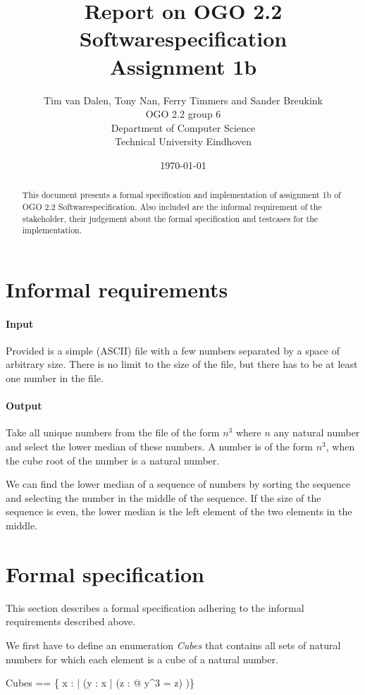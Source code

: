 \documentclass[12pt]{article}
\title{Report on OGO 2.2 Softwarespecification\\ Assignment 1b}
\author{
        Tim van Dalen, Tony Nan, Ferry Timmers and Sander Breukink\\ OGO 2.2 group 6 \\
                Department of Computer Science\\
        Technical University Eindhoven\\
}
\date{\today}
\begin{document}
\maketitle

\begin{abstract}
This document presents a formal specification and implementation of assignment 1b of OGO 2.2 Softwarespecification. Also included are the informal requirement of the stakeholder, their judgement about the formal specification and testcases for the implementation.
\end{abstract}

\section{Informal requirements}
\paragraph{Input} Provided is a simple (ASCII) file with a few numbers separated by a space of arbitrary size. There is no limit to the size of the file, but there has to be at least one number in the file.

\paragraph{Output} Take all unique numbers from the file of the form $n^3$ where $n$ any natural number and select the lower median of these numbers. A number is of the form $n^3$, when the cube root of the number is a natural number.

We can find the lower median of a sequence of numbers by sorting the sequence and selecting the number in the middle of the sequence. If the size of the sequence is even, the lower median is the left element of the two elements in the middle.

\section{Formal specification}

This section describes a formal specification adhering to the informal requirements described above.

We first have to define an enumeration \textit{Cubes} that contains all sets of natural numbers for which each element is a cube of a natural number.
\begin{axdef}
Cubes == \{ x : \power \nat | (\forall y : x | (\exists z : \nat @ y^3 = z) )\}
\end{axdef}
\end{document}
